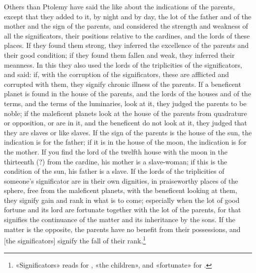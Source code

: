 \documentclass[11pt]{article}
\newcommand{\Fol}[1]{\marginpar{\footnotesize\color{gray}f.\,#1}}
\begin{document}
\par \Fol{39r}Others than Ptolemy have said the like about the indications of the parents, except that they added to it, by night and by day, the lot of the father and of the mother and the sign of the parents, and considered the strength and weakness of all the significators, their positions relative to the cardines, and the lords of these places. If they found them strong, they inferred the excellence of the parents and their good condition; if they found them fallen and weak, they inferred their meanness. In this they also used the lords of the triplicities of the significators, and said: if, with the corruption of the significators, these are afflicted and corrupted with them, they signify chronic illness of the parents. If a beneficent planet is found in the house of the parents, and the lords of the houses and of the terms, and the terms of the luminaries, look at it, they judged the parents to be noble; if the maleficent planets look at the house of the parents from quadrature or opposition, or are in it, and the beneficent do not look at it, they judged that they are slaves or like slaves. If the sign of the parents is the house of the sun, the indication is for the father; if it is in the house of the moon, the indication is for the mother. If you find the lord of the twelfth house with the moon in the thirteenth (?) from the cardine, his mother is a slave-woman; if this is the condition of the sun, his father is a slave. If the lords of the triplicities of someone's significator are in their own dignities, in praiseworthy places of the sphere, free from the maleficent planets, with the beneficent looking at them, they signify gain and rank in what is to come; especially when the lot of good fortune and its lord are fortunate together with the lot of the parents, for that signifies the continuance of the matter and its inheritance by the sons. If the matter is the opposite, the parents have no benefit from their possessions, and [the significators] signify the fall of their rank.\footnote{«Significators» reads  for , «the children», and «fortunate»  for .}\par
\end{document}
